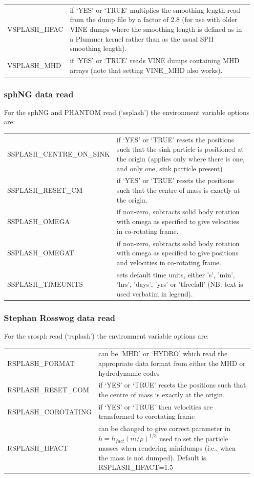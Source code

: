 \documentclass[a4paper,10pt]{article}
\begin{document}
\begin{tabular}{p{}p{}}
VSPLASH\_HFAC & if `YES' or `TRUE' multiplies the smoothing length read from the dump file by a factor of 2.8 (for use with older VINE dumps where the smoothing length is defined as in a Plummer kernel rather than as the usual SPH smoothing length). \\
VSPLASH\_MHD & if `YES' or `TRUE' reads VINE dumps containing MHD arrays (note that setting VINE\_MHD also works). \\
\end{tabular}

\subsubsection{ sphNG data read}
 For the sphNG and PHANTOM read (`ssplash') the environment variable options are:\newline

\begin{tabular}{p{}p{}}
SSPLASH\_CENTRE\_ON\_SINK & if `YES' or `TRUE' resets the positions such that the sink particle is positioned at the origin (applies only where there is one, and only one, sink particle present)\\
SSPLASH\_RESET\_CM & if `YES' or `TRUE' resets the positions such that the centre of mass is exactly at the origin. \\
SSPLASH\_OMEGA & if non-zero, subtracts solid body rotation with omega as specified to give velocities in co-rotating frame. \\
SSPLASH\_OMEGAT & if non-zero, subtracts solid body rotation with omega as specified to give positions and velocities in co-rotating frame. \\
SSPLASH\_TIMEUNITS & sets default time units, either 's', 'min', 'hrs', 'days', 'yrs' or 'tfreefall' (NB: text is used verbatim in legend).
\end{tabular}

\subsubsection{ Stephan Rosswog data read}
 For the srosph read (`rsplash') the environment variable options are:\newline

\begin{tabular}{p{}p{}}
RSPLASH\_FORMAT & can be `MHD' or `HYDRO' which read the appropriate data format from either the MHD or hydrodynamic codes \\
RSPLASH\_RESET\_COM & if `YES' or `TRUE' resets the positions such that the centre of mass is exactly at the origin. \\
RSPLASH\_COROTATING & if `YES' or `TRUE' then velocities are transformed to corotating frame \\
RSPLASH\_HFACT & can be changed to give correct parameter in $h=h_{fact}(m/\rho)^{1/3}$ used to set the particle masses when rendering minidumps (i.e., when the mass is not dumped). Default is RSPLASH\_HFACT=1.5
\end{tabular}
\end{document}

